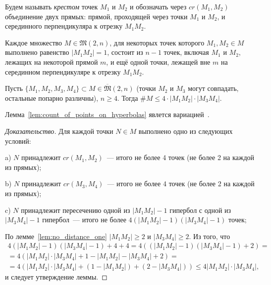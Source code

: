 \documentclass[11pt,twoside,draft
]{article}
\begin{document}
\begin{definition}
	\cite[определение 2.5]{my-pps-linear-bound-2019}
	Будем называть \textit{крестом} точек $M_1$ и $M_2$ и обозначать через $cr(M_1,M_2)$ объединение двух прямых:
	прямой, проходящей через точки $M_1$ и $M_2$,
	и серединного перпендикуляра к отрезку $M_1 M_2$.
\end{definition}

\begin{lemm}
	\cite[теорема 3.10]{my-pps-linear-bound-2019}
	\label{lem:no_distance_one}
	Каждое множество $M\in\mathfrak{M}(2,n)$,
	для некоторых точек которого $M_1,M_2 \in M$ выполнено равенство $|M_1 M_2|=1$,
	состоит из $n-1$ точек, включая $M_1$ и $M_2$, лежащих на некоторой прямой $m$,
	и ещё одной точки, лежащей вне $m$ на серединном перпендикуляре к отрезку $M_1 M_2$.
\end{lemm}


\begin{lemm}
	\label{lem:count_of_points_on_hyperbolas}
	Пусть $\{M_1, M_2, M_3, M_4\} \subset M\in\overline{\mathfrak{M}}(2,n)$
	(точки $M_2$ и $M_3$ могут совпадать, остальные попарно различны), $n\geq 4$.
	Тогда $\# M \leq 4 \cdot |M_1 M_2| \cdot |M_3 M_4|$.
\end{lemm}

\begin{remark}
	Лемма~\ref{lem:count_of_points_on_hyperbolas} явлется вариацией~\cite{erdos1945integral}.
\end{remark}

\begin{proof}[Доказательство]
	Для каждой точки $N\in M$ выполнено одно из следующих условий:

	a) $N$ принадлежит $cr(M_1,M_2)$~--- итого не более 4 точек (не более 2 на каждой из прямых);

	b) $N$ принадлежит $cr(M_3,M_4)$~--- итого не более 4 точек (не более 2 на каждой из прямых);

	c) $N$ принадлежит пересечению одной из $|M_1 M_2| - 1$ гипербол
	с одной из $|M_3 M_4| - 1$ гипербол~--- итого не более  $4 (|M_1 M_2| - 1)(|M_3 M_4| - 1)$ точек;

	По лемме~\ref{lem:no_distance_one} $|M_1 M_2| \geq 2$ и $|M_3 M_4| \geq 2$.
	Из того, что
	\begin{multline}
		4 (|M_1 M_2| - 1)(|M_3 M_4| - 1) + 4 + 4
		=
		4 ( (|M_1 M_2| - 1)(|M_3 M_4| - 1) + 2)
		=
		\\=
		4 ( |M_1 M_2| \cdot |M_3 M_4| + 1 - |M_1 M_2| - |M_3 M_4| + 2)
		=
		\\=
		4 ( |M_1 M_2| \cdot |M_3 M_4| + (1 - |M_1 M_2|) + (2 - |M_3 M_4|))
		\leq
		4 |M_1 M_2| \cdot |M_3 M_4|
		,
	\end{multline}
	и следует утверждение леммы.
\end{proof}
\end{document}
